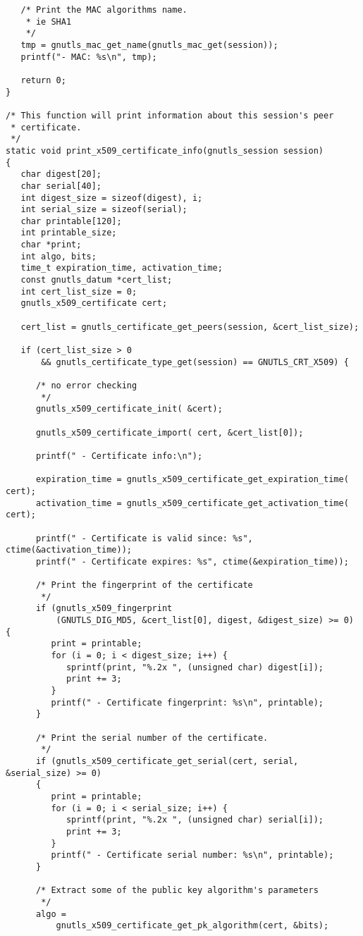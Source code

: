 \begin{verbatim}
   /* Print the MAC algorithms name.
    * ie SHA1
    */
   tmp = gnutls_mac_get_name(gnutls_mac_get(session));
   printf("- MAC: %s\n", tmp);

   return 0;
}

/* This function will print information about this session's peer
 * certificate. 
 */
static void print_x509_certificate_info(gnutls_session session)
{
   char digest[20];
   char serial[40];
   int digest_size = sizeof(digest), i;
   int serial_size = sizeof(serial);
   char printable[120];
   int printable_size;
   char *print;
   int algo, bits;
   time_t expiration_time, activation_time;
   const gnutls_datum *cert_list;
   int cert_list_size = 0;
   gnutls_x509_certificate cert;

   cert_list = gnutls_certificate_get_peers(session, &cert_list_size);

   if (cert_list_size > 0
       && gnutls_certificate_type_get(session) == GNUTLS_CRT_X509) {

      /* no error checking
       */
      gnutls_x509_certificate_init( &cert);

      gnutls_x509_certificate_import( cert, &cert_list[0]);

      printf(" - Certificate info:\n");

      expiration_time = gnutls_x509_certificate_get_expiration_time( cert);
      activation_time = gnutls_x509_certificate_get_activation_time( cert);

      printf(" - Certificate is valid since: %s", ctime(&activation_time));
      printf(" - Certificate expires: %s", ctime(&expiration_time));

      /* Print the fingerprint of the certificate
       */
      if (gnutls_x509_fingerprint
          (GNUTLS_DIG_MD5, &cert_list[0], digest, &digest_size) >= 0) {
         print = printable;
         for (i = 0; i < digest_size; i++) {
            sprintf(print, "%.2x ", (unsigned char) digest[i]);
            print += 3;
         }
         printf(" - Certificate fingerprint: %s\n", printable);
      }

      /* Print the serial number of the certificate.
       */
      if (gnutls_x509_certificate_get_serial(cert, serial, &serial_size) >= 0) 
      {
         print = printable;
         for (i = 0; i < serial_size; i++) {
            sprintf(print, "%.2x ", (unsigned char) serial[i]);
            print += 3;
         }
         printf(" - Certificate serial number: %s\n", printable);
      }

      /* Extract some of the public key algorithm's parameters
       */
      algo =
          gnutls_x509_certificate_get_pk_algorithm(cert, &bits);


\end{verbatim}
